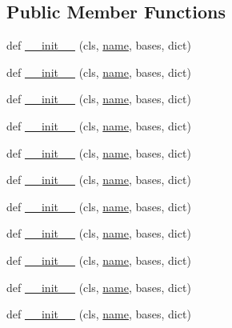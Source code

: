 \subsection*{Public Member Functions}
\begin{DoxyCompactItemize}
\item 
def \hyperlink{classwaflib_1_1_task_1_1store__task__type_a4a7cee4bfb945dbf41fbe178590bcd29}{\+\_\+\+\_\+init\+\_\+\+\_\+} (cls, \hyperlink{lib_2expat_8h_a1b49b495b59f9e73205b69ad1a2965b0}{name}, bases, dict)
\item 
def \hyperlink{classwaflib_1_1_task_1_1store__task__type_a4a7cee4bfb945dbf41fbe178590bcd29}{\+\_\+\+\_\+init\+\_\+\+\_\+} (cls, \hyperlink{lib_2expat_8h_a1b49b495b59f9e73205b69ad1a2965b0}{name}, bases, dict)
\item 
def \hyperlink{classwaflib_1_1_task_1_1store__task__type_a4a7cee4bfb945dbf41fbe178590bcd29}{\+\_\+\+\_\+init\+\_\+\+\_\+} (cls, \hyperlink{lib_2expat_8h_a1b49b495b59f9e73205b69ad1a2965b0}{name}, bases, dict)
\item 
def \hyperlink{classwaflib_1_1_task_1_1store__task__type_a4a7cee4bfb945dbf41fbe178590bcd29}{\+\_\+\+\_\+init\+\_\+\+\_\+} (cls, \hyperlink{lib_2expat_8h_a1b49b495b59f9e73205b69ad1a2965b0}{name}, bases, dict)
\item 
def \hyperlink{classwaflib_1_1_task_1_1store__task__type_a4a7cee4bfb945dbf41fbe178590bcd29}{\+\_\+\+\_\+init\+\_\+\+\_\+} (cls, \hyperlink{lib_2expat_8h_a1b49b495b59f9e73205b69ad1a2965b0}{name}, bases, dict)
\item 
def \hyperlink{classwaflib_1_1_task_1_1store__task__type_a4a7cee4bfb945dbf41fbe178590bcd29}{\+\_\+\+\_\+init\+\_\+\+\_\+} (cls, \hyperlink{lib_2expat_8h_a1b49b495b59f9e73205b69ad1a2965b0}{name}, bases, dict)
\item 
def \hyperlink{classwaflib_1_1_task_1_1store__task__type_a4a7cee4bfb945dbf41fbe178590bcd29}{\+\_\+\+\_\+init\+\_\+\+\_\+} (cls, \hyperlink{lib_2expat_8h_a1b49b495b59f9e73205b69ad1a2965b0}{name}, bases, dict)
\item 
def \hyperlink{classwaflib_1_1_task_1_1store__task__type_a4a7cee4bfb945dbf41fbe178590bcd29}{\+\_\+\+\_\+init\+\_\+\+\_\+} (cls, \hyperlink{lib_2expat_8h_a1b49b495b59f9e73205b69ad1a2965b0}{name}, bases, dict)
\item 
def \hyperlink{classwaflib_1_1_task_1_1store__task__type_a4a7cee4bfb945dbf41fbe178590bcd29}{\+\_\+\+\_\+init\+\_\+\+\_\+} (cls, \hyperlink{lib_2expat_8h_a1b49b495b59f9e73205b69ad1a2965b0}{name}, bases, dict)
\item 
def \hyperlink{classwaflib_1_1_task_1_1store__task__type_a4a7cee4bfb945dbf41fbe178590bcd29}{\+\_\+\+\_\+init\+\_\+\+\_\+} (cls, \hyperlink{lib_2expat_8h_a1b49b495b59f9e73205b69ad1a2965b0}{name}, bases, dict)
\item 
def \hyperlink{classwaflib_1_1_task_1_1store__task__type_a4a7cee4bfb945dbf41fbe178590bcd29}{\+\_\+\+\_\+init\+\_\+\+\_\+} (cls, \hyperlink{lib_2expat_8h_a1b49b495b59f9e73205b69ad1a2965b0}{name}, bases, dict)
\end{DoxyCompactItemize}
